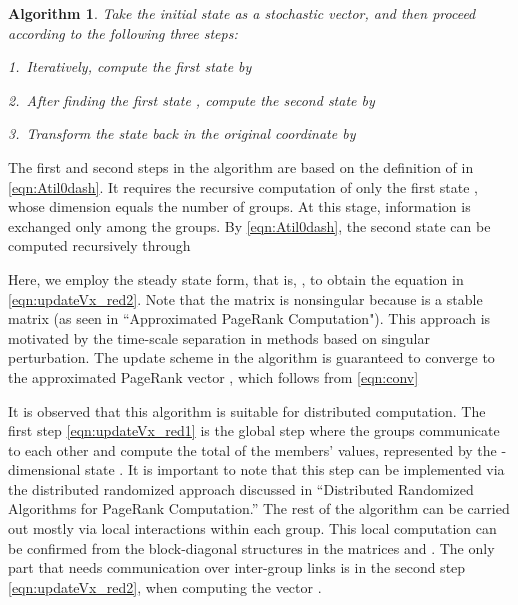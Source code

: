 \documentclass[11pt,draftcls,onecolumn]{IEEEtran}
\newtheorem{algorithm}[theorem]{Algorithm}
\begin{document}
\begin{algorithm}
\label{alg:1}\rm 
Take the initial state  as a stochastic vector, and 
then proceed according to the following three steps:

1.~Iteratively, compute the first state  by


2.~After finding the first state ,
compute the second state  by


3.~Transform the state back in 
the original coordinate by

\end{algorithm}

\medskip
The first and second steps in the algorithm are based on the
definition of  in \eqref{eqn:Atil0dash}.
It requires the recursive computation of only the first state 
, whose dimension 
equals the number  of groups. At this stage, 
information is exchanged only among the groups.
By \eqref{eqn:Atil0dash}, the second state  can
be computed recursively through

Here, we employ the steady state form, that is, , 
to obtain the equation in \eqref{eqn:updateVx_red2}.
Note that the matrix  is nonsingular
because  is a stable matrix (as seen in 
``Approximated PageRank Computation").
This approach is motivated by the time-scale separation in methods based on
singular perturbation.
The update scheme in the algorithm is guaranteed to converge to 
the approximated PageRank vector , which follows from \eqref{eqn:conv}


It is observed that this algorithm is suitable for distributed computation. 
The first step \eqref{eqn:updateVx_red1} is the global step
where the groups communicate to each other and
compute the total of the members' values, represented by 
the -dimensional state .
It is important to note that this step can be implemented via the 
distributed randomized approach discussed in 
``Distributed Randomized Algorithms for PageRank Computation.''
The rest of the algorithm can be carried out mostly  
via local interactions within each group.
This local computation can be confirmed from the block-diagonal structures in
the matrices  and .
The only part that needs communication over inter-group links
is in the second step \eqref{eqn:updateVx_red2}, when 
computing the vector .
\end{document}
